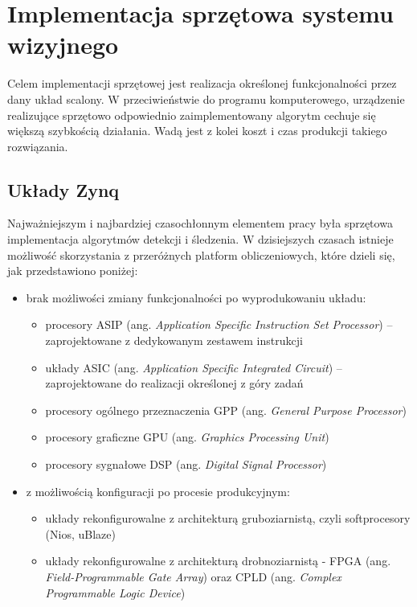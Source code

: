 \chapter{Implementacja sprzętowa systemu wizyjnego}

Celem implementacji sprzętowej jest realizacja określonej funkcjonalności przez dany układ scalony. W przeciwieństwie do programu komputerowego, urządzenie realizujące sprzętowo odpowiednio zaimplementowany algorytm cechuje się większą szybkością działania. Wadą jest z kolei koszt i czas produkcji takiego rozwiązania.

\section{Układy Zynq}

Najważniejszym i najbardziej czasochłonnym elementem pracy była sprzętowa implementacja algorytmów detekcji i śledzenia. %
W dzisiejszych czasach istnieje możliwość skorzystania z przeróżnych platform obliczeniowych, które dzieli się, jak przedstawiono poniżej:
\begin{itemize}
	\item brak możliwości zmiany funkcjonalności po wyprodukowaniu układu:
	\begin{itemize}
		\item procesory ASIP (ang. \textit{Application Specific Instruction Set Processor}) -- zaprojektowane z dedykowanym zestawem instrukcji		
		\item układy ASIC (ang. \textit{Application Specific Integrated Circuit}) -- zaprojektowane do realizacji określonej z góry zadań
		\item procesory ogólnego przeznaczenia GPP (ang. \textit{General Purpose Processor}) %
		\item procesory graficzne GPU (ang. \textit{Graphics Processing Unit})
		\item procesory sygnałowe DSP (ang. \textit{Digital Signal Processor})
	\end{itemize}
	\item z możliwością konfiguracji po procesie produkcyjnym:
	\begin{itemize} 
		\item układy rekonfigurowalne z architekturą gruboziarnistą,  czyli softprocesory (Nios, uBlaze)%
		\item układy rekonfigurowalne z architekturą drobnoziarnistą - FPGA (ang. \textit{Field-Programmable Gate Array}) oraz CPLD (ang. \textit{Complex Programmable Logic Device})
	\end{itemize}
\end{itemize}

